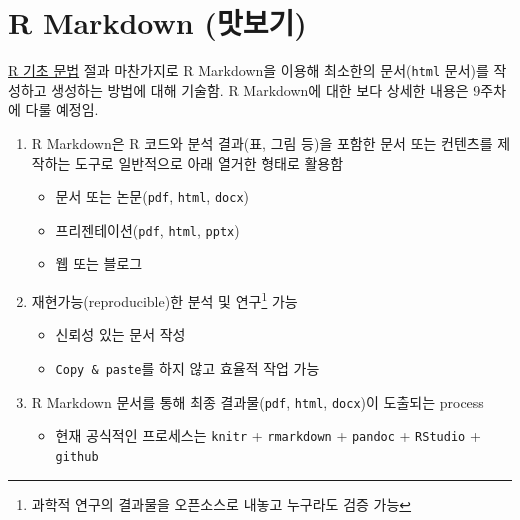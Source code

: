 \documentclass[
  11pt,
]{krantz}
\makeatletter
\providecommand{\tightlist}{%
  \setlength{\itemsep}{0pt}\setlength{\parskip}{0pt}}
\newenvironment{kframe}{%
\medskip{}
\setlength{\fboxsep}{.8em}
 \def\at@end@of@kframe{}%
 \ifinner\ifhmode%
  \def\at@end@of@kframe{\end{minipage}}%
  \begin{minipage}{\columnwidth}%
 \fi\fi%
 \def\FrameCommand##1{\hskip\@totalleftmargin \hskip-\fboxsep
 \colorbox{shadecolor}{##1}\hskip-\fboxsep
     \hskip-\linewidth \hskip-\@totalleftmargin \hskip\columnwidth}%
 \MakeFramed {\advance\hsize-\width
   \@totalleftmargin\z@ \linewidth\hsize
   \@setminipage}}%
 {\par\unskip\endMakeFramed%
 \at@end@of@kframe}
\newenvironment{rmdblock}[1]
  {
  \begin{itemize}
  \renewcommand{\labelitemi}{
    \raisebox{-.7\height}[0pt][0pt]{
      {\setkeys{Gin}{width=3em,keepaspectratio}\texttt{[image: images/\#1]}}
    }
  }
  \setlength{\fboxsep}{1em}
  \begin{kframe}
  \item
  }
  {
  \end{kframe}
  \end{itemize}
  }
\newenvironment{rmdnote}
  {\begin{rmdblock}{note}}
  {\end{rmdblock}}
\makeatother
\begin{document}
\hypertarget{r-markdown-get-start}{%
\section{R Markdown (맛보기)}\label{r-markdown-get-start}}

\footnotesize

\begin{rmdnote}
\protect\hyperlink{r-basic}{R 기초 문법} 절과 마찬가지로 R Markdown을 이용해 최소한의 문서(\texttt{html} 문서)를 작성하고 생성하는 방법에 대해 기술함.
R Markdown에 대한 보다 상세한 내용은 9주차에 다룰 예정임.
\end{rmdnote}

\normalsize

\begin{enumerate}
\def\labelenumi{\arabic{enumi}.}
\tightlist
\item
  R Markdown은 R 코드와 분석 결과(표, 그림 등)을 포함한 문서 또는 컨텐츠를 제작하는 도구로 일반적으로 아래 열거한 형태로 활용함

  \begin{itemize}
  \tightlist
  \item
    문서 또는 논문(\texttt{pdf}, \texttt{html}, \texttt{docx})
  \item
    프리젠테이션(\texttt{pdf}, \texttt{html}, \texttt{pptx})
  \item
    웹 또는 블로그
  \end{itemize}
\item
  재현가능(reproducible)한 분석 및 연구\footnote{과학적 연구의 결과물을 오픈소스로 내놓고 누구라도 검증 가능} 가능

  \begin{itemize}
  \tightlist
  \item
    신뢰성 있는 문서 작성
  \item
    \texttt{Copy\ \&\ paste}를 하지 않고 효율적 작업 가능
  \end{itemize}
\item
  R Markdown 문서를 통해 최종 결과물(\texttt{pdf}, \texttt{html}, \texttt{docx})이 도출되는 process

  \begin{itemize}
  \tightlist
  \item
    현재 공식적인 프로세스는 \texttt{knitr} + \texttt{rmarkdown} + \texttt{pandoc} + \texttt{RStudio} + \texttt{github}
  \end{itemize}
\end{enumerate}

\footnotesize
\end{document}
